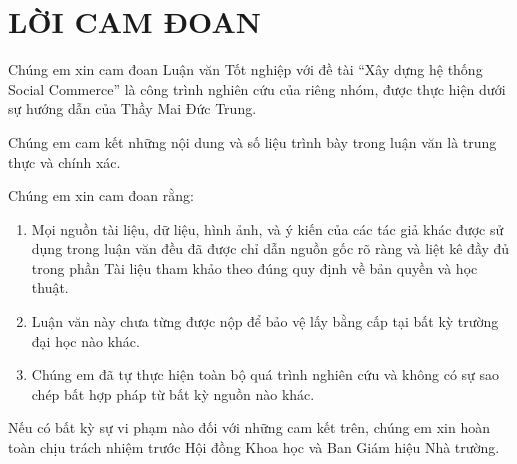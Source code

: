 \section*{LỜI CAM ĐOAN}
\thispagestyle{empty}

\vspace{0.5cm}

Chúng em xin cam đoan Luận văn Tốt nghiệp với đề tài ``Xây dựng hệ thống Social Commerce'' là công trình nghiên cứu của riêng nhóm, được thực hiện dưới sự hướng dẫn của Thầy Mai Đức Trung.

\vspace{0.5cm}

Chúng em cam kết những nội dung và số liệu trình bày trong luận văn là trung thực và chính xác.

\vspace{0.5cm}

Chúng em xin cam đoan rằng:
\begin{enumerate}
    \item Mọi nguồn tài liệu, dữ liệu, hình ảnh, và ý kiến của các tác giả khác được sử dụng trong luận văn đều đã được chỉ dẫn nguồn gốc rõ ràng và liệt kê đầy đủ trong phần Tài liệu tham khảo theo đúng quy định về bản quyền và học thuật.
    \item Luận văn này chưa từng được nộp để bảo vệ lấy bằng cấp tại bất kỳ trường đại học nào khác.
    \item Chúng em đã tự thực hiện toàn bộ quá trình nghiên cứu và không có sự sao chép bất hợp pháp từ bất kỳ nguồn nào khác.
\end{enumerate}

\vspace{0.5cm}

Nếu có bất kỳ sự vi phạm nào đối với những cam kết trên, chúng em xin hoàn toàn chịu trách nhiệm trước Hội đồng Khoa học và Ban Giám hiệu Nhà trường.

\clearpage